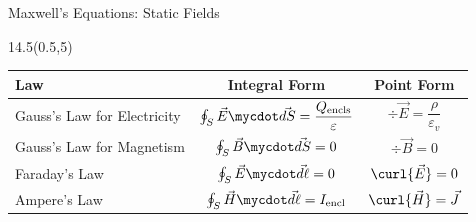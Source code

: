 \begin{lesson28}
\begin{frame}{Maxwell's Equations: Static Fields}
\begin{textblock}{14.5}(0.5,5)
\begin{center}
\renewcommand{\arraystretch}{1.5}
\begin{tabular}{| l | c | c | }
	\hline
	\textbf{Law} 				& \textbf{Integral Form} 				& \textbf{Point Form} \\\hline\hline
	Gauss's Law for Electricity 	
		& $\oint_S \vec{E}\mycdot \vec{dS} = \dfrac{Q_{\text{encls}}}{\varepsilon}$ 	
		& $\div{\vec{E}} = \dfrac{\rho}{\varepsilon_v} $
	\\\hline
	Gauss's Law for Magnetism 	
		& $\oint_S \vec{B} \mycdot \vec{dS} = 0$
		& $\div{\vec{B}}  = 0 $
	\\\hline
	Faraday's Law	
		& $\oint_S \vec{E}\mycdot \vec{d\ell} =  0$
		& $\curl{\vec{E}} = 0 $
	\\\hline
	Ampere's Law
		&$\oint_S \vec{H}\mycdot \vec{d\ell} = I_{\text{encl}} $
		&$\curl{\vec{H}} = \vec{J} $
	\\\hline
\end{tabular}	
\end{center}
\end{textblock}
\end{frame}
\end{lesson28}
